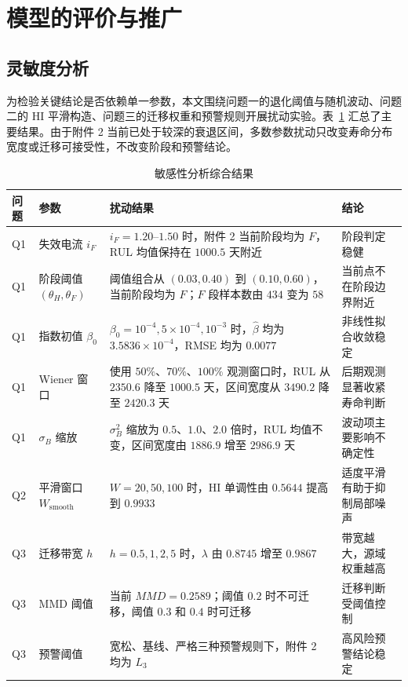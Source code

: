 \section{模型的评价与推广}\label{sec:sensitivity}

\subsection{灵敏度分析}

为检验关键结论是否依赖单一参数，本文围绕问题一的退化阈值与随机波动、问题二的 HI 平滑构造、问题三的迁移权重和预警规则开展扰动实验。表~\ref{tab:sens_summary} 汇总了主要结果。由于附件 2 当前已处于较深的衰退区间，多数参数扰动只改变寿命分布宽度或迁移可接受性，不改变阶段和预警结论。

\begin{table}[H]
  \centering
  \caption{敏感性分析综合结果}
  \label{tab:sens_summary}
  \begin{tabularx}{\textwidth}{llXl}
    \toprule
    问题 & 参数 & 扰动结果 & 结论 \\
    \midrule
    Q1 & 失效电流 $i_F$ & $i_F=1.20$--$1.50$ 时，附件 2 当前阶段均为 $F$，RUL 均值保持在 $1000.5$ 天附近 & 阶段判定稳健 \\
    Q1 & 阶段阈值 $(\theta_H,\theta_F)$ & 阈值组合从 $(0.03,0.40)$ 到 $(0.10,0.60)$，当前阶段均为 $F$；$F$ 段样本数由 $434$ 变为 $58$ & 当前点不在阶段边界附近 \\
    Q1 & 指数初值 $\beta_0$ & $\beta_0=10^{-4},5\times10^{-4},10^{-3}$ 时，$\hat\beta$ 均为 $3.5836\times10^{-4}$，RMSE 均为 $0.0077$ & 非线性拟合收敛稳定 \\
    Q1 & Wiener 窗口 & 使用 $50\%$、$70\%$、$100\%$ 观测窗口时，RUL 从 $2350.6$ 降至 $1000.5$ 天，区间宽度从 $3490.2$ 降至 $2420.3$ 天 & 后期观测显著收紧寿命判断 \\
    Q1 & $\sigma_B$ 缩放 & $\sigma_B^2$ 缩放为 $0.5$、$1.0$、$2.0$ 倍时，RUL 均值不变，区间宽度由 $1886.9$ 增至 $2986.9$ 天 & 波动项主要影响不确定性 \\
    Q2 & 平滑窗口 $W_{\mathrm{smooth}}$ & $W=20,50,100$ 时，HI 单调性由 $0.5644$ 提高到 $0.9933$ & 适度平滑有助于抑制局部噪声 \\
    Q3 & 迁移带宽 $h$ & $h=0.5,1,2,5$ 时，$\lambda$ 由 $0.8745$ 增至 $0.9867$ & 带宽越大，源域权重越高 \\
    Q3 & MMD 阈值 & 当前 $MMD=0.2589$；阈值 $0.2$ 时不可迁移，阈值 $0.3$ 和 $0.4$ 时可迁移 & 迁移判断受阈值控制 \\
    Q3 & 预警阈值 & 宽松、基线、严格三种预警规则下，附件 2 均为 $L_3$ & 高风险预警结论稳定 \\
    \bottomrule
  \end{tabularx}
\end{table}

